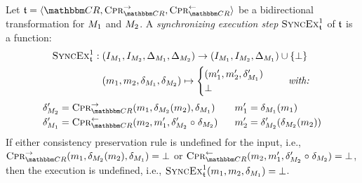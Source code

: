 \begin{definition}
    \label{def:synchronizingtransformationexecutionstep}
    Let $\transformation{t} = \tupled{\consistencyrelationset{CR}, \consistencypreservationrule{\consistencyrelationset{CR}}^{\rightarrow}, \consistencypreservationrule{\consistencyrelationset{CR}}^{\leftarrow}}$ be a bidirectional transformation for $\metamodel{M}{1}$ and $\metamodel{M}{2}$.
    A \emph{synchronizing execution step} $\function{SyncEx}_{\transformation{t}}^1$ of $\transformation{t}$ is a function:
    \begin{align*}
        \function{SyncEx}_{\transformation{t}}^1 : \; & (\metamodelinstanceset{M}{1}, \metamodelinstanceset{M}{2}, \changeuniverse{\metamodel{M}{1}}, \changeuniverse{\metamodel{M}{2}}) \rightarrow (\metamodelinstanceset{M}{1}, \metamodelinstanceset{M}{2}, \changeuniverse{\metamodel{M}{1}}) \cup \setted{\bot} \\
        & (\model{m}{1}, \model{m}{2}, \change{\metamodel{M}{1}}, \change{\metamodel{M}{2}}) \mapsto 
        \begin{cases} 
            (\model{m}{1}', \model{m}{2}', \change{\metamodel{M}{1}}') \\
            \bot
        \end{cases} \quad \mathtextspacearound{with:} 
    \end{align*}
    \vspace{-\abovedisplayskip}
    \vspace{-\belowdisplayskip}
    \begin{alignat*}{2}
        & 
        \change{\metamodel{M}{2}}' = \consistencypreservationrule{\consistencyrelationset{CR}}^{\rightarrow}(\model{m}{1}, \change{\metamodel{M}{2}}(\model{m}{2}), \change{\metamodel{M}{1}}) %
        \quad &&
        \model{m}{1}' = \change{\metamodel{M}{1}}(\model{m}{1}) \\
        & 
        \change{\metamodel{M}{1}}' = \consistencypreservationrule{\consistencyrelationset{CR}}^{\leftarrow}(\model{m}{2}, \model{m}{1}', \change{\metamodel{M}{2}}' \concatfunction \change{\metamodel{M}{2}}) %
        &&
        \model{m}{2}' = \change{\metamodel{M}{2}}'(\change{\metamodel{M}{2}}(\model{m}{2}))
    \end{alignat*}
    If either consistency preservation rule is undefined for the input, i.e., $\consistencypreservationrule{\consistencyrelationset{CR}}^{\rightarrow}(\model{m}{1}, \change{\metamodel{M}{2}}(\model{m}{2}), \change{\metamodel{M}{1}}) = \bot$ or $\consistencypreservationrule{\consistencyrelationset{CR}}^{\leftarrow}(\model{m}{2}, \model{m}{1}', \change{\metamodel{M}{2}}' \concatfunction \change{\metamodel{M}{2}}) = \bot$, then the execution is undefined, i.e., $\function{SyncEx}_{\transformation{t}}^1(\model{m}{1}, \model{m}{2}, \change{\metamodel{M}{1}}) = \bot$.

\end{definition}
